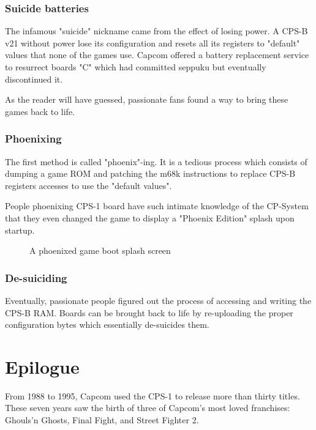 \subsubsection{Suicide batteries}
The infamous "suicide" nickname came from the effect of losing power. A CPS-B v21 without power lose its configuration and resets all its registers to "default" values that none of the games use. Capcom offered a battery replacement service to resurrect boards "C" which had committed seppuku but eventually discontinued it. 

As the reader will have guessed, passionate fans found a way to bring these games back to life.

\subsubsection{Phoenixing}
The first method is called "phoenix"-ing. It is a tedious process which consists of dumping a game ROM and patching the m68k instructions to replace CPS-B registers accesses to use the "default values"\cite{csp1_phoenix}. 

People phoenixing CPS-1 board have such intimate knowledge of the CP-System that they even changed the game to display a "Phoenix Edition" splash upon startup.

\begin{figure}[H]
\caption*{A phoenixed game boot splash screen}
\end{figure}


\subsubsection{De-suiciding}
Eventually, passionate people figured out the process of accessing and writing the CPS-B RAM. Boards can be brought back to life by re-uploading the proper configuration bytes which essentially de-suicides them\cite{arcadeHackerCPS1Desuicide}.







\section{Epilogue}
From 1988 to 1995, Capcom used the CPS-1 to release more than thirty titles. These seven years saw the birth of three of Capcom's most loved franchises: Ghouls’n Ghosts, Final Fight, and Street Fighter 2.

